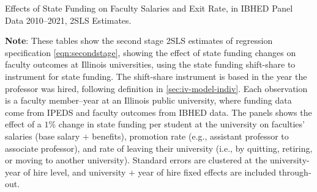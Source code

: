 \begin{table}[H]
    \singlespacing
    \centering
    \caption{Effects of State Funding on Faculty Salaries and Exit Rate, in IBHED Panel Data 2010--2021, 2SLS Estimates.}
    \label{tab:faculty-shock-illinois-rolling}
    \makebox[\textwidth][c]{}
    
    \makebox[\textwidth][c]{}

    \makebox[\textwidth][c]{}

    \justify
    \footnotesize
    \textbf{Note}: 
    These tables show the second stage 2SLS estimates of regression specification \eqref{eqn:secondstage}, showing the effect of state funding changes on faculty outcomes at Illinois universities, using the state funding shift-share to instrument for state funding.
    The shift-share instrument is based in the year the professor was hired, following definition in \autoref{sec:iv-model-indiv}.
    Each observation is a faculty member--year at an Illinois public university, where funding data come from IPEDS and faculty outcomes from IBHED data.
    The panels shows the effect of a $1$\% change in state funding per student at the university on faculties' salaries (base salary $+$ benefits), promotion rate (e.g., assistant professor to associate professor), and rate of leaving their university (i.e., by quitting, retiring, or moving to another university).
    Standard errors are clustered at the university-year of hire level, and university $+$ year of hire fixed effects are included through-out.
\end{table}
